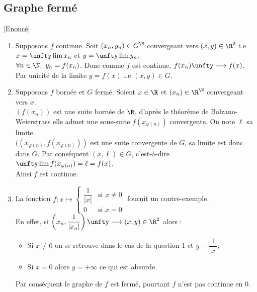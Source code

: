 \documentclass{book}
\begin{document}
	\subsection{Graphe fermé }
	\label{sec:graphe-ferme}
	\textcolor{blue}{\hyperref[Graphe fermé]{[Enoncé]}}\\
	\begin{enumerate}[leftmargin=*]
		\item Supposons $f$ continue. Soit $(x_n,y_n)\in G^\N$ convergeant vers $(x,y)\in \R^2$ i.e $x=\unfty\lim x_n$ et $y=\unfty\lim y_n$.\\
		$\forall n\in \N,\ y_n=f(x_n)$. Donc comme $f$ est continue, $f(x_n)\unfty\longrightarrow f(x)$. Par unicité de la limite $y=f(x)$ i.e $(x,y)\in G$.
		\item Supposons $f$ bornée et $G$ fermé. Soient $x\in \R$ et $(x_n)\in \R^\N$ convergeant vers $x$.\\
		$(f(x_n))$ est une suite bornée de $\R$, d'après le théorème de Bolzano-Weierstrass elle admet une sous-suite $f(x_{\varphi(n)})$ convergente. On note $\ell$ sa limite.\\
		$((x_{\varphi(n)},f(x_{\varphi(n)}))$ est une suite convergente de $G$, sa limite est donc dans $G$. Par conséquent $(x,\ell)\in G$, c'est-à-dire $\unfty\lim f(x_{\varphi(n)})=\ell=f(x)$.\\
		Ainsi $f$ est continue.
		\item La fonction $f:x\mapsto\begin{cases}
			\dfrac{1}{|x|}&\mbox{si }x\ne 0\\
			0&\mbox{si }x=0
		\end{cases}$ fournit un contre-exemple.\\
		En effet, si $\left(x_n,\dfrac{1}{|x_n|}\right)\unfty\longrightarrow(x,y)\in \R^2$ alors :
		\begin{itemize}
			\item Si $x\ne 0$ on se retrouve dans le cas de la question 1 et $y=\dfrac{1}{|x|}$;
			\item Si $x=0$ alors $y=+\infty$ ce qui est absurde.
		\end{itemize}
		Par conséquent le graphe de $f$ est fermé, pourtant $f$ n'est pas continue en $0$.
	\end{enumerate}
	
\end{document}
